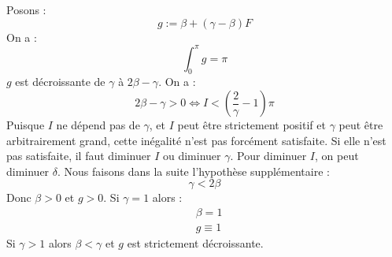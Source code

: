 \documentclass[a4paper,english,french]{article}
\begin{document}
Posons :
\begin{equation*}
  g := \beta + (\gamma - \beta) F
\end{equation*}
On a :
\begin{equation*}
  \int_0 ^\pi g = \pi
\end{equation*}
$g$ est décroissante de $\gamma$ à $2 \beta - \gamma$. On a :
\begin{equation*}
  2 \beta - \gamma > 0
  \Leftrightarrow I < \left(\frac{2}{\gamma} - 1 \right) \pi
\end{equation*}
Puisque $I$ ne dépend pas de $\gamma$, et $I$ peut être strictement
positif et $\gamma$ peut être arbitrairement grand, cette inégalité
n'est pas forcément satisfaite. Si elle n'est pas satisfaite, il faut
diminuer $I$ ou diminuer $\gamma$. Pour diminuer $I$, on peut diminuer
$\delta$. Nous faisons dans la suite l'hypothèse supplémentaire :
\begin{equation*}
  \gamma < 2 \beta
\end{equation*}
Donc $\beta > 0$ et $g > 0$. Si $\gamma = 1$ alors :
\begin{align*}
  & \beta = 1 \\
  & g \equiv 1
\end{align*}
Si $\gamma > 1$ alors $\beta < \gamma$ et $g$ est strictement
décroissante.
\end{document}

